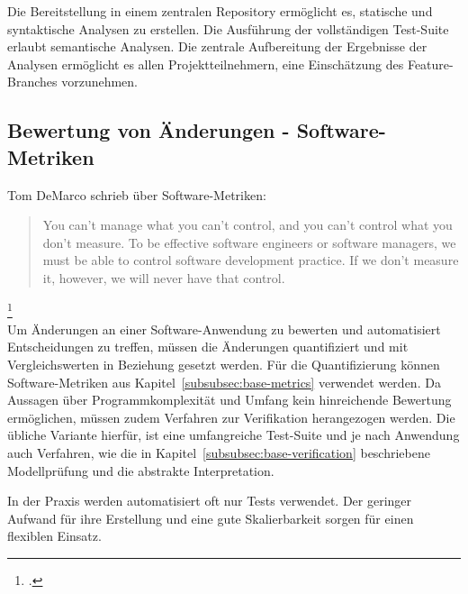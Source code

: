 Die Bereitstellung in einem zentralen Repository ermöglicht es, statische und syntaktische Analysen zu erstellen. Die Ausführung der vollständigen Test-Suite erlaubt semantische Analysen. Die zentrale Aufbereitung der Ergebnisse der Analysen ermöglicht es allen Projektteilnehmern, eine Einschätzung des Feature-Branches vorzunehmen.

\subsection{Bewertung von Änderungen - Software-Metriken}
\label{subsec:main-metrics}

Tom DeMarco schrieb über Software-Metriken:

\blockquote{You can’t manage what you can’t control, and you can’t control what you
don’t measure. To be effective software engineers or software managers, we
must be able to control software development practice. If we don’t measure
it, however, we will never have that control.}\footcite{demarco1986}
\\

Um Änderungen an einer Software-Anwendung zu bewerten und automatisiert Entscheidungen zu treffen, müssen die Änderungen quantifiziert und mit Vergleichswerten in Beziehung gesetzt werden. Für die Quantifizierung können Software-Metriken aus  Kapitel~\ref{subsubsec:base-metrics} verwendet werden. Da Aussagen über Programmkomplexität und Umfang kein hinreichende Bewertung ermöglichen, müssen zudem Verfahren zur Verifikation herangezogen werden. Die übliche Variante hierfür, ist eine umfangreiche Test-Suite und je nach Anwendung auch Verfahren, wie die in Kapitel~\ref{subsubsec:base-verification} beschriebene Modellprüfung und die abstrakte Interpretation.

In der Praxis werden automatisiert oft nur Tests verwendet. Der geringer Aufwand für ihre Erstellung und eine gute Skalierbarkeit sorgen für einen flexiblen Einsatz. 

